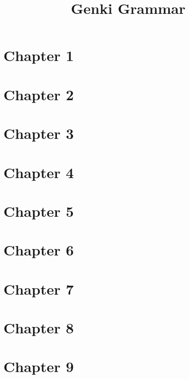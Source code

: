 \documentclass{article}
\title{Genki Grammar}
\makeatletter
\newcommand{\getCurrentSectionNumber}{%
  \ifnum\c@section=0 %
  \thechapter
  \else
  \ifnum\c@subsection=0 %
  \thesection
  \else
  \ifnum\c@subsubsection=0 %
  \thesubsection
  \else
  \thesubsubsection
  \fi
  \fi
  \fi
}
\newcommand{\inputchapter}[2]{\section{Chapter #1}\label{\getCurrentSectionNumber}}
\makeatother
\begin{document}
\tableofcontents

\inputchapter{1}{01.tex}
\inputchapter{2}{02.tex}
\inputchapter{3}{03.tex}
\inputchapter{4}{04.tex}
\inputchapter{5}{05.tex}
\inputchapter{6}{06.tex}
\inputchapter{7}{07.tex}
\inputchapter{8}{08.tex}
\inputchapter{9}{09.tex}
\end{document}
